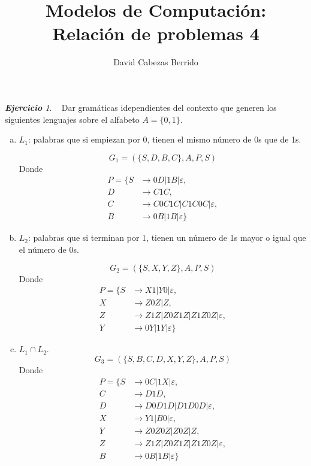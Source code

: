 \documentclass[12pt,spanish]{article}
\theoremstyle{definition}
\theoremstyle{remark}
\newtheorem{exercise}{\textbf{Ejercicio}}%
\begin{document}
\title{Modelos de Computación: \\ Relación de problemas 4}
\author{David Cabezas Berrido}
\date{\vspace{-5mm}}
\maketitle

\setcounter{exercise}{13}

\begin{exercise}~ Dar gramáticas idependientes del contexto que
  generen los siguientes lenguajes sobre el alfabeto $A=\{0,1\}$.

  \begin{enumerate}[a)]
  \item $L_1$: palabras que si empiezan por 0, tienen el mismo número
    de 0s que de 1s.

    \[G_1=(\{S,D,B,C\},A,P,S)\]
    Donde \vspace{-5mm}
    \begin{align*}
      P=\{S&\rightarrow 0D|1B|\varepsilon, \\
      D&\rightarrow C1C, \\
      C&\rightarrow C0C1C|C1C0C|\varepsilon, \\
      B&\rightarrow 0B|1B|\varepsilon\}
    \end{align*}
    
  \item $L_2$: palabras que si terminan por 1, tienen un número de 1s
    mayor o igual que el número de 0s.

    \[G_2=(\{S,X,Y,Z\},A,P,S)\]
    Donde \vspace{-5mm}
    \begin{align*}
      P=\{S&\rightarrow X1|Y0|\varepsilon, \\
      X&\rightarrow Z0Z|Z, \\
      Z&\rightarrow Z1Z|Z0Z1Z|Z1Z0Z|\varepsilon, \\
      Y&\rightarrow 0Y|1Y|\varepsilon\}
    \end{align*}

  \item $L_1\cap L_2$.
    \[G_3=(\{S,B,C,D,X,Y,Z\},A,P,S)\]
    Donde \vspace{-5mm}
    \begin{align*}
      P=\{S&\rightarrow 0C|1X|\varepsilon, \\
      C&\rightarrow D1D, \\
      D&\rightarrow D0D1D|D1D0D|\varepsilon, \\
      X&\rightarrow Y1|B0|\varepsilon, \\
      Y&\rightarrow Z0Z0Z|Z0Z|Z, \\
      Z&\rightarrow Z1Z|Z0Z1Z|Z1Z0Z|\varepsilon, \\
      B&\rightarrow 0B|1B|\varepsilon\}
    \end{align*}
  \end{enumerate}
  
\end{exercise}
\end{document}
